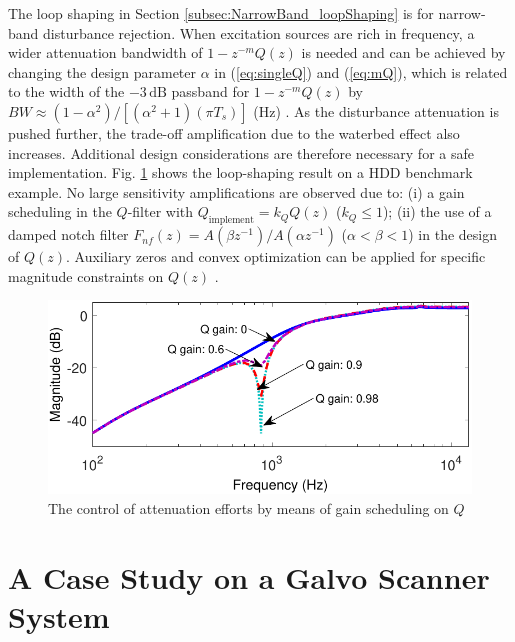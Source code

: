\documentclass [11pt, proquest] {uwthesis}[2020/02/24]
\begin{document}
The loop shaping in Section \ref{subsec:NarrowBand_loopShaping} is
for narrow-band disturbance rejection. When excitation sources are
rich in frequency, a wider attenuation bandwidth of $1-z^{-m}Q(z)$
is needed and can be achieved by changing the design parameter $\alpha$
in (\ref{eq:singleQ}) and (\ref{eq:mQ}), which is related to the
width of the $-3\,\text{dB}$ passband for $1-z^{-m}Q(z)$ by $BW\approx(1-\alpha^{2})/[(\alpha^{2}+1)(\pi T_{s})]$
(Hz) \cite{chen2013inverse}. As the disturbance attenuation is pushed
further, the trade-off amplification due to the waterbed effect also
increases. Additional design considerations are therefore necessary
for a safe implementation. Fig. \ref{fig:The-control-of} shows the
loop-shaping result on a HDD benchmark example. No large sensitivity
amplifications are observed due to: (i) a gain scheduling in the $Q$-filter
with $Q_{\text{implement}}=k_{Q}Q(z)$ ($k_{Q}\leq1$); (ii) the use
of a damped notch filter $F_{nf}(z)=A(\beta z^{-1})/A(\alpha z^{-1})$
($\alpha<\beta<1$) in the design of $Q(z)$. Auxiliary zeros and
convex optimization can be applied for specific magnitude constraints
on $Q(z)$ \cite{chen2014optimal}.
\begin{figure}[!ht]
\begin{centering}
\includegraphics[width=13cm]{Loop-shaping/bandlimited_bode_S_Qgian_scheduling}
\par\end{centering}
\caption{\label{fig:The-control-of}The control of attenuation efforts by means
of gain scheduling on $Q$}
\end{figure}

\section{A Case Study on a Galvo Scanner System} \label{sec:A-Case-Study-on-a-Galvo-Scanner-System}
\end{document}
